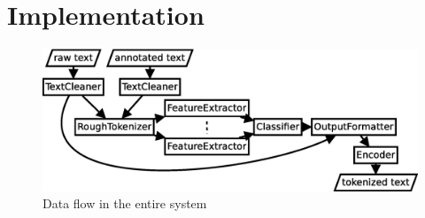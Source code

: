 \chapter{Implementation}
\label{chap:impl}

\begin{figure}[ht]
  \includegraphics[width=\textwidth]{img/all-parts.eps}
  \caption{Data flow in the entire system}
  \label{fig:all-parts}
\end{figure}


